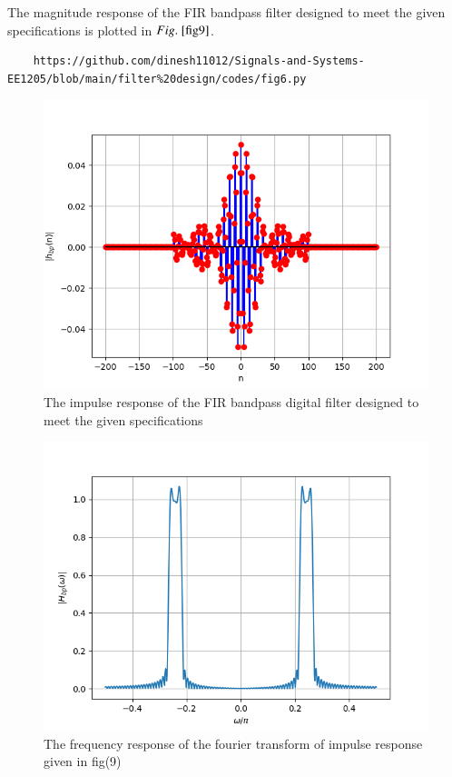 \documentclass{article}
\begin{document}
The magnitude response of the FIR bandpass filter designed to meet the given specifications is plotted in $\figref{fig9}$.
\begin{lstlisting}
	https://github.com/dinesh11012/Signals-and-Systems-EE1205/blob/main/filter%20design/codes/fig6.py
\end{lstlisting}
\begin{figure}[H]
\includegraphics[width = \columnwidth]{figs/Hbp_impulse.png}
\caption{The impulse response of the FIR bandpass digital filter designed to meet the given specifications}
\label{fig9}
\end{figure}

\begin{figure}[H]
\includegraphics[width = \columnwidth]{figs/Hbp_frequency.png}
\caption{The frequency response of the fourier transform of impulse response given in fig(9)} 
\label{fig10}
\end{figure}
\end{document}
